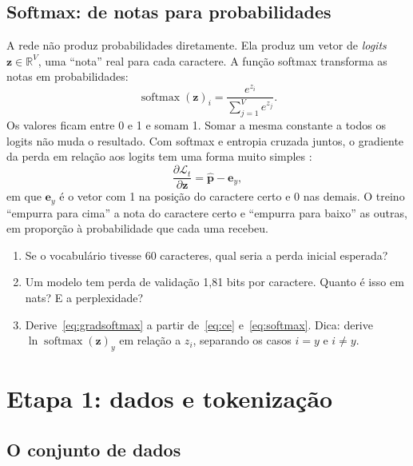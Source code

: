 \documentclass[11pt,a4paper]{article}
\newcommand{\R}{\mathbb{R}}
\newcommand{\softmax}{\operatorname{softmax}}
\begin{document}
\subsection{Softmax: de notas para probabilidades}

A rede não produz probabilidades diretamente. Ela produz um vetor de \emph{logits} $\bm z \in \R^V$, uma ``nota'' real para cada caractere. A função softmax transforma as notas em probabilidades:
\begin{equation}
\softmax(\bm z)_i = \frac{e^{z_i}}{\sum_{j=1}^{V} e^{z_j}}.
\label{eq:softmax}
\end{equation}
Os valores ficam entre 0 e 1 e somam 1. Somar a mesma constante a todos os logits não muda o resultado. Com softmax e entropia cruzada juntos, o gradiente da perda em relação aos logits tem uma forma muito simples \cite[seção~6.2.2.3]{goodfellow}:
\begin{equation}
\frac{\partial \mathcal{L}_t}{\partial \bm z} = \hat{\bm p} - \bm e_{y},
\label{eq:gradsoftmax}
\end{equation}
em que $\bm e_y$ é o vetor com 1 na posição do caractere certo e 0 nas demais. O treino ``empurra para cima'' a nota do caractere certo e ``empurra para baixo'' as outras, em proporção à probabilidade que cada uma recebeu.

\begin{exercicios}
\begin{enumerate}
\item Se o vocabulário tivesse 60 caracteres, qual seria a perda inicial esperada?
\item Um modelo tem perda de validação 1,81 bits por caractere. Quanto é isso em nats? E a perplexidade?
\item Derive~\eqref{eq:gradsoftmax} a partir de~\eqref{eq:ce} e~\eqref{eq:softmax}. Dica: derive $\ln\softmax(\bm z)_y$ em relação a $z_i$, separando os casos $i=y$ e $i\neq y$.
\end{enumerate}
\end{exercicios}

\section{Etapa 1: dados e tokenização}
\label{sec:dados}

\subsection{O conjunto de dados}
\end{document}
